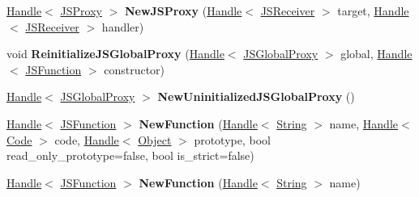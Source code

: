\begin{DoxyCompactItemize}
\item 
\hyperlink{classv8_1_1internal_1_1_handle}{Handle}$<$ \hyperlink{classv8_1_1internal_1_1_j_s_proxy}{J\+S\+Proxy} $>$ {\bfseries New\+J\+S\+Proxy} (\hyperlink{classv8_1_1internal_1_1_handle}{Handle}$<$ \hyperlink{classv8_1_1internal_1_1_j_s_receiver}{J\+S\+Receiver} $>$ target, \hyperlink{classv8_1_1internal_1_1_handle}{Handle}$<$ \hyperlink{classv8_1_1internal_1_1_j_s_receiver}{J\+S\+Receiver} $>$ handler)\hypertarget{classv8_1_1internal_1_1_factory_a3a544c11eb5811364e7428c934056bd8}{}\label{classv8_1_1internal_1_1_factory_a3a544c11eb5811364e7428c934056bd8}

\item 
void {\bfseries Reinitialize\+J\+S\+Global\+Proxy} (\hyperlink{classv8_1_1internal_1_1_handle}{Handle}$<$ \hyperlink{classv8_1_1internal_1_1_j_s_global_proxy}{J\+S\+Global\+Proxy} $>$ global, \hyperlink{classv8_1_1internal_1_1_handle}{Handle}$<$ \hyperlink{classv8_1_1internal_1_1_j_s_function}{J\+S\+Function} $>$ constructor)\hypertarget{classv8_1_1internal_1_1_factory_a6bbb216726d9805eba2f20cb4fe7a54b}{}\label{classv8_1_1internal_1_1_factory_a6bbb216726d9805eba2f20cb4fe7a54b}

\item 
\hyperlink{classv8_1_1internal_1_1_handle}{Handle}$<$ \hyperlink{classv8_1_1internal_1_1_j_s_global_proxy}{J\+S\+Global\+Proxy} $>$ {\bfseries New\+Uninitialized\+J\+S\+Global\+Proxy} ()\hypertarget{classv8_1_1internal_1_1_factory_a9b6bf70066bd5ceecec26a5924029291}{}\label{classv8_1_1internal_1_1_factory_a9b6bf70066bd5ceecec26a5924029291}

\item 
\hyperlink{classv8_1_1internal_1_1_handle}{Handle}$<$ \hyperlink{classv8_1_1internal_1_1_j_s_function}{J\+S\+Function} $>$ {\bfseries New\+Function} (\hyperlink{classv8_1_1internal_1_1_handle}{Handle}$<$ \hyperlink{classv8_1_1internal_1_1_string}{String} $>$ name, \hyperlink{classv8_1_1internal_1_1_handle}{Handle}$<$ \hyperlink{classv8_1_1internal_1_1_code}{Code} $>$ code, \hyperlink{classv8_1_1internal_1_1_handle}{Handle}$<$ \hyperlink{classv8_1_1internal_1_1_object}{Object} $>$ prototype, bool read\+\_\+only\+\_\+prototype=false, bool is\+\_\+strict=false)\hypertarget{classv8_1_1internal_1_1_factory_a947e46d8bcdb0ff91acc3159c7b8087c}{}\label{classv8_1_1internal_1_1_factory_a947e46d8bcdb0ff91acc3159c7b8087c}

\item 
\hyperlink{classv8_1_1internal_1_1_handle}{Handle}$<$ \hyperlink{classv8_1_1internal_1_1_j_s_function}{J\+S\+Function} $>$ {\bfseries New\+Function} (\hyperlink{classv8_1_1internal_1_1_handle}{Handle}$<$ \hyperlink{classv8_1_1internal_1_1_string}{String} $>$ name)\hypertarget{classv8_1_1internal_1_1_factory_a24b83a2de5b56d5304bc16c70951a0fb}{}\label{classv8_1_1internal_1_1_factory_a24b83a2de5b56d5304bc16c70951a0fb}


\end{DoxyCompactItemize}
